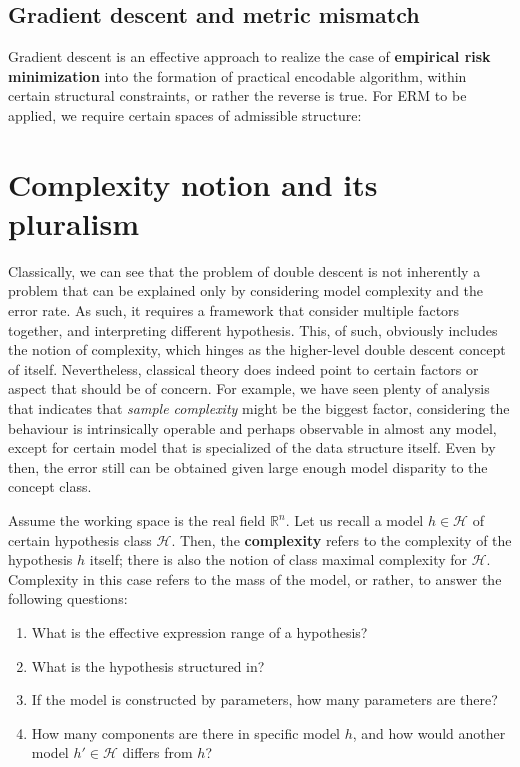 \subsection{Gradient descent and metric mismatch}

Gradient descent is an effective approach to realize the case of \textbf{empirical risk minimization} into the formation of practical encodable algorithm, within certain structural constraints, or rather the reverse is true. For ERM to be applied, we require certain spaces of admissible structure:


\section{Complexity notion and its pluralism}

Classically, we can see that the problem of double descent is not inherently a problem that can be explained only by considering model complexity and the error rate. As such, it requires a framework that consider multiple factors together, and interpreting different hypothesis. This, of such, obviously includes the notion of complexity, which hinges as the higher-level double descent concept of itself. Nevertheless, classical theory does indeed point to certain factors or aspect that should be of concern. For example, we have seen plenty of analysis that indicates that \textit{sample complexity} might be the biggest factor, considering the behaviour is intrinsically operable and perhaps observable in almost any model, except for certain model that is specialized of the data structure itself. Even by then, the error still can be obtained given large enough model disparity to the concept class.  

Assume the working space is the real field $\mathbb{R}^{n}$. Let us recall a model $h\in\mathcal{H}$ of certain hypothesis class $\mathcal{H}$. Then, the \textbf{complexity} refers to the complexity of the hypothesis $h$ itself; there is also the notion of class maximal complexity for $\mathcal{H}$. Complexity in this case refers to the mass of the model, or rather, to answer the following questions:
\begin{enumerate}[itemsep=1pt,topsep=1pt]
    \item What is the effective expression range of a hypothesis?
    \item What is the hypothesis structured in?
    \item If the model is constructed by parameters, how many parameters are there?
    \item How many components are there in specific model $h$, and how would another model $h'\in \mathcal{H}$ differs from $h$?
\end{enumerate}

